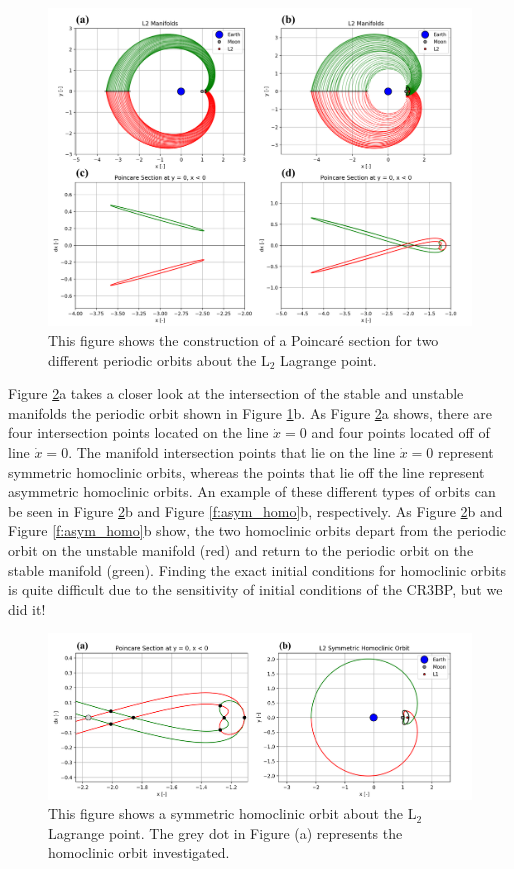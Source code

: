\documentclass[11pt]{article} %
\begin{document}
\begin{figure}[H]
    \centering
    \includegraphics[width=\textwidth]{poincare_comb.png}
    \caption{This figure shows the construction of a Poincar\'{e} section for two different periodic orbits about the L$_2$ Lagrange point.}
    \label{f:poincare}
\end{figure}

Figure \ref{f:sym_homo}a takes a closer look at the intersection of the stable and unstable manifolds the periodic orbit shown in Figure \ref{f:poincare}b. As Figure \ref{f:sym_homo}a shows, there are four intersection points located on the line $\dot{x}=0$ and four points located off of line $\dot{x}=0$. The manifold intersection points that lie on the line $\dot{x}=0$ represent symmetric homoclinic orbits, whereas the points that lie off the line represent asymmetric homoclinic orbits. An example of these different types of orbits can be seen in Figure \ref{f:sym_homo}b and Figure \ref{f:asym_homo}b, respectively. As Figure \ref{f:sym_homo}b and Figure \ref{f:asym_homo}b show, the two homoclinic orbits depart from the periodic orbit on the unstable manifold (red) and return to the periodic orbit on the stable manifold (green). Finding the exact initial conditions for homoclinic orbits is quite difficult due to the sensitivity of initial conditions of the CR3BP, but we did it!

\begin{figure}[H]
    \centering
    \includegraphics[width=\textwidth]{sym_homo_comb.png}
    \caption{This figure shows a symmetric homoclinic orbit about the L$_2$ Lagrange point. The grey dot in Figure (a) represents the homoclinic orbit investigated.}
    \label{f:sym_homo}
\end{figure}
\end{document}

